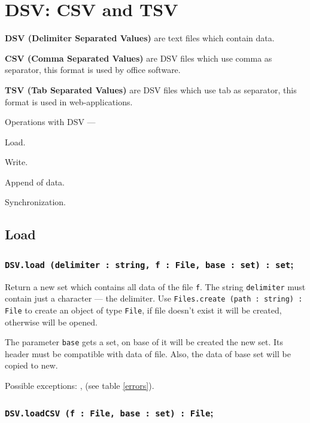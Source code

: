 \section{DSV: CSV and TSV}

{\bf DSV (Delimiter Separated Values)} are text files which contain data.

{\bf CSV (Comma Separated Values)} are DSV files which use comma as separator, this format is used by office software.

{\bf TSV (Tab Separated Values)} are DSV files which use tab as separator, this format is used in web-applications.

Operations with DSV —
\begin{icItems}
	\item Load.
	\item Write.
	\item Append of data.
	\item Synchronization.
\end{icItems}

\subsection{Load}

\subsubsection{\texttt{DSV.load (delimiter : string, f : File, base : set) : set};}

Return a new set which contains all data of the file \texttt{f}. The string \texttt{delimiter} must contain just a character — the delimiter. Use \texttt{Files.create (path : string) : File} to create an object of type \texttt{File}, if file doesn't exist it will be created, otherwise will be opened.

The parameter \texttt{base} gets a set, on base of it will be created the new set. Its header must be compatible with data of file. Also, the data of base set will be copied to new.

Possible exceptions: ,  (see table \ref{errors}).

\subsubsection{\texttt{DSV.loadCSV (f : File, base : set) : File};}

